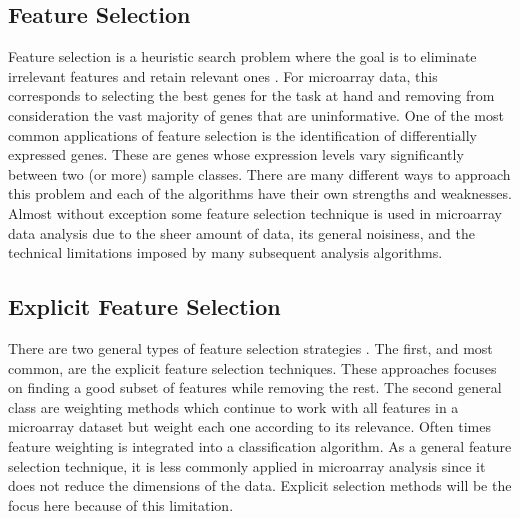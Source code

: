 {\subsection{Feature Selection}

Feature selection is a heuristic search problem where the goal is to eliminate
irrelevant features and retain relevant ones \cite{PMID_15219288}.  For microarray data,
this corresponds to selecting the best genes for the task at hand and removing
from consideration the vast majority of genes that are uninformative. One of
the most common applications of feature selection is the identification of
differentially expressed genes.  These are genes whose expression levels vary
significantly between two (or more) sample classes.  There are many different
ways to approach this problem and each of the algorithms have their own
strengths and weaknesses.  Almost without exception some feature
selection technique is used in microarray data analysis due to the sheer amount
of data, its general noisiness, and the technical limitations imposed by many
subsequent analysis algorithms.

\subsection{Explicit Feature Selection}

There are two general types of feature selection strategies
\cite{Xing_2003,PMID_15219288}.  The first, and most common, are the explicit feature
selection techniques.  These approaches focuses on finding a good subset of
features while removing the rest. The second general class are weighting
methods which continue to work with all features in a microarray dataset but
weight each one according to its relevance.  Often times feature weighting
is integrated into a classification algorithm.  As a general
feature selection technique, it is less commonly applied in microarray analysis
since it does not reduce the dimensions of the data.  Explicit selection
methods will be the focus here because of this limitation.


}
